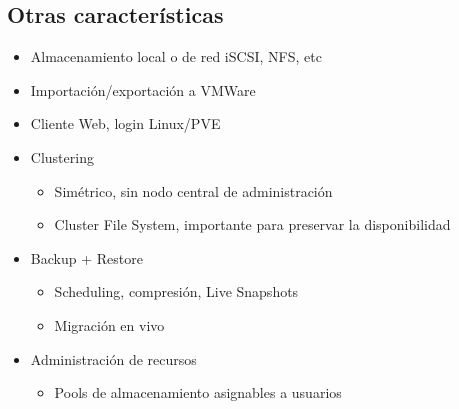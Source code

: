 \subsection{Otras características}
	\begin{itemize}
		\item Almacenamiento local o de red iSCSI, NFS, etc
		\item Importación/exportación a VMWare
		\item Cliente Web, login Linux/PVE
		\item Clustering
		\begin{itemize}
 			\item Simétrico, sin nodo central de administración 
			\item Cluster File System, importante para preservar la disponibilidad
	 	\end{itemize}		
 		\item Backup + Restore
		\begin{itemize}
		 	\item Scheduling, compresión, Live Snapshots
			\item Migración en vivo
		 \end{itemize}
		\item Administración de recursos
	\begin{itemize}
 		\item Pools de almacenamiento asignables a usuarios
 	\end{itemize}
\end{itemize}
